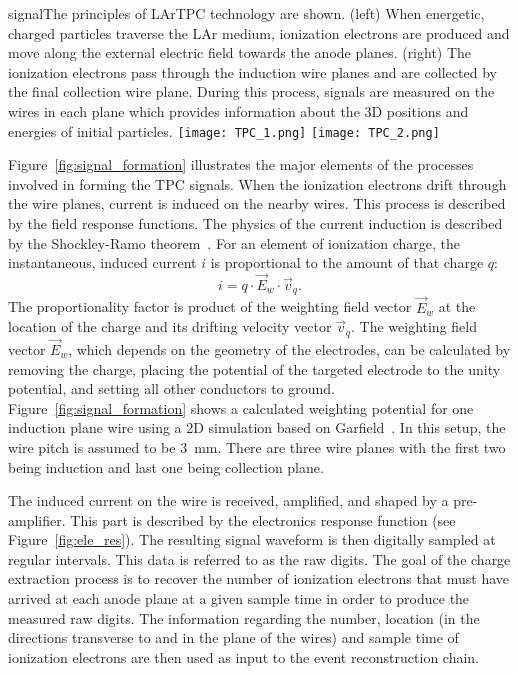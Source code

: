 \begin{cdrfigure}{signal}{The principles of LArTPC technology are shown. (left) When energetic, charged particles 
traverse the LAr medium, ionization electrons are produced and move
along the external electric field towards the anode planes. (right) The ionization
electrons pass through the induction wire planes and are  collected by the 
final collection wire plane. 
During this process, signals are measured on the wires
in each plane which provides information about the 3D positions and
energies of initial particles.}
\texttt{[image: TPC\_1.png]}
\texttt{[image: TPC\_2.png]}
\end{cdrfigure}


Figure~\ref{fig:signal_formation} illustrates the major elements of the processes 
involved in forming the TPC signals. When the ionization electrons drift through the 
wire planes, current is induced on the nearby wires. This process is described by the 
field response functions. The physics of the current induction is described by the 
Shockley-Ramo theorem~\cite{Shockley,Ramo}.  For an element of ionization charge, 
the instantaneous, induced current $i$ is proportional to the amount of that
charge $q$: 
\begin{equation}
i = q \cdot \vec{E}_{w} \cdot \vec{v}_q.
\end{equation}
The proportionality factor is product of the weighting field vector $\vec{E}_{w}$ 
at the location of the charge and its drifting velocity vector $\vec{v}_q$. 
The weighting field vector $\vec{E}_{w}$, which depends on the geometry of the electrodes, 
can be calculated by removing the charge,  placing the potential of the targeted 
electrode to the unity potential, and setting all other conductors to ground. 
Figure~\ref{fig:signal_formation} shows a calculated weighting potential 
for one 
induction plane wire using a 2D simulation based on Garfield~\cite{garfield}. 
In this setup, the wire pitch is assumed to be 3~mm. There are three wire planes 
with the first two being induction and last one being collection plane.  

The induced current on the wire is received, amplified, and shaped by
a pre-amplifier. This part is described by the electronics response
function (see Figure~\ref{fig:ele_res}).  
The resulting signal waveform is then digitally sampled at
regular intervals.  This data is referred to as the raw digits.  The
goal of the charge extraction process is to recover the number of
ionization electrons that must have arrived at each anode plane at a
given sample time in order to produce the measured raw digits.  The
information regarding the number, location (in the directions transverse
to and in the plane of the wires) and sample time of ionization
electrons are then used as input to the event reconstruction chain.

